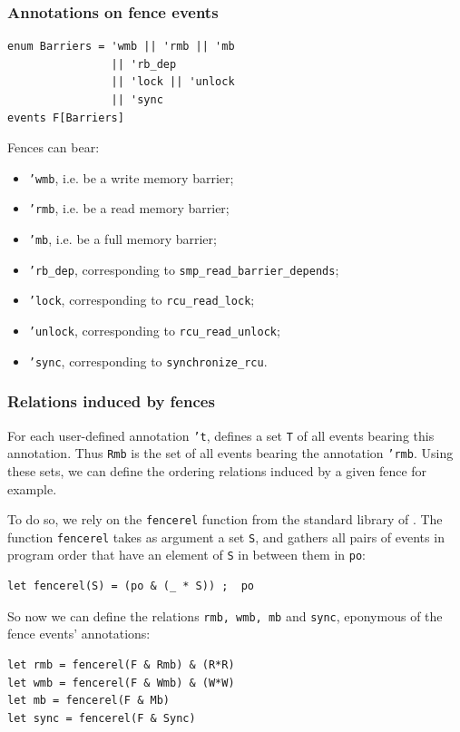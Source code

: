 \documentclass[a4paper]{article}
\begin{document}
\subsubsection{Annotations on fence events}

\begin{verbatim}
enum Barriers = 'wmb || 'rmb || 'mb
                || 'rb_dep
                || 'lock || 'unlock 
                || 'sync 
events F[Barriers]
\end{verbatim}

Fences can bear:
\begin{itemize}
\item {\tt 'wmb}, i.e. be a write memory barrier;
\item {\tt 'rmb}, i.e. be a read memory barrier;
\item {\tt 'mb}, i.e. be a full memory barrier;
\item {\tt 'rb\_dep}, corresponding to {\tt smp\_read\_barrier\_depends};
\item {\tt 'lock}, corresponding to {\tt rcu\_read\_lock};
\item {\tt 'unlock}, corresponding to {\tt rcu\_read\_unlock};
\item {\tt 'sync}, corresponding to {\tt synchronize\_rcu}.
\end{itemize}

\subsubsection{Relations induced by fences}

For each user-defined annotation {\tt 't},  defines a set {\tt T} of
all events bearing this annotation. Thus {\tt Rmb} is the set of all events
bearing the annotation {\tt 'rmb}. Using these sets, we can define the ordering
relations induced by a given fence for example. 

To do so, we rely on the {\tt fencerel} function from the standard library of
. The function {\tt fencerel} takes as argument a set {\tt S}, and
gathers all pairs of events in program order that have an element of {\tt S} in
between them in {\tt po}:
\begin{verbatim}
let fencerel(S) = (po & (_ * S)) ;  po
\end{verbatim}

So now we can define the relations {\tt rmb, wmb, mb} and {\tt sync}, eponymous
of the fence events' annotations:
\begin{verbatim}
let rmb = fencerel(F & Rmb) & (R*R)
let wmb = fencerel(F & Wmb) & (W*W)
let mb = fencerel(F & Mb)
let sync = fencerel(F & Sync)
\end{verbatim}
\end{document}
